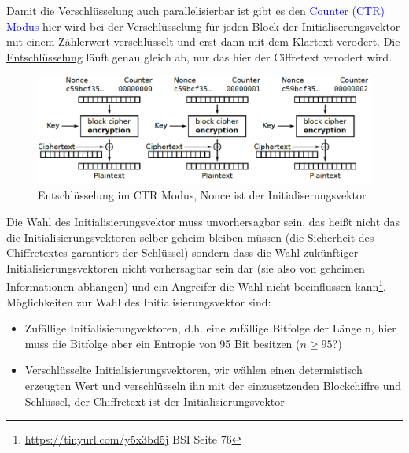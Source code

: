\documentclass[a4paper,12pt]{article}
\newcommand{\blue}[1]{\textcolor{blue}{#1}}
\begin{document}
Damit die Verschlüsselung auch parallelisierbar ist gibt es den \blue{Counter (CTR) Modus} hier wird bei der Verschlüsselung für jeden Block der Initialiserungsvektor mit einem Zählerwert verschlüsselt und erst dann mit dem Klartext verodert. Die \hyperref[pic:CTRModus]{Entschlüsselung} läuft genau gleich ab, nur das hier der Ciffretext verodert wird.\\
\begin{figure}
\centering
\includegraphics[scale=0.5]{Grafiken/CounterCTRModus.png}
\caption{Entschlüsselung im CTR Modus, Nonce ist der Initialiserungsvektor}
\label{pic:CTRModus}
\end{figure}
Die Wahl des Initialisierungsvektor muss unvorhersagbar sein, das heißt nicht das die Initialisierungsvektoren selber geheim bleiben müssen (die Sicherheit des Chiffretextes garantiert der Schlüssel) sondern dass die Wahl zukünftiger Initialisierungsvektoren nicht vorhersagbar sein dar (sie also von geheimen Informationen abhängen) und ein Angreifer die Wahl nicht beeinflussen kann\footnote{\url{https://tinyurl.com/y5x3bd5j} BSI Seite 76}.\\
Möglichkeiten zur Wahl des Initialisierungsvektor sind:
\begin{itemize}
\item Zufällige Initialisierungvektoren, d.h. eine zufällige Bitfolge der Länge n, hier muss die Bitfolge aber ein Entropie von 95 Bit besitzen ($n\geq95$?)
\item Verschlüsselte Initialisierungsvektoren, wir wählen einen determistisch erzeugten Wert und verschlüsseln ihn mit der einzusetzenden Blockchiffre und Schlüssel, der Chiffretext ist der Initialisierungsvektor
\end{itemize}
\end{document}
